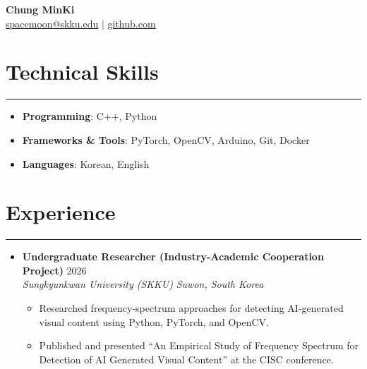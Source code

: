 \documentclass[letterpaper, 10pt]{article}
\begin{document}
\begin{center}
\textbf{\LARGE Chung MinKi} \\ \vspace{2pt}
\href{mailto:spacemoon@skku.edu}{\underline{spacemoon@skku.edu}} $|$
\href{https://github.com/justinkays}{\underline{github.com}}
\end{center}
\section*{Technical Skills}
\hrule
\vspace{4pt}
\begin{itemize}
\item[] \textbf{Programming}: C++, Python%
\item[] \textbf{Frameworks \& Tools}: PyTorch, OpenCV, Arduino, Git, Docker%
\item[] \textbf{Languages}: Korean, English%
\end{itemize}
\section*{Experience}
\hrule
\vspace{4pt}
\begin{itemize}
\item[]
\textbf{Undergraduate Researcher (Industry-Academic Cooperation Project)} \hfill 2026 \\
\textit{Sungkyunkwan University (SKKU)} \hfill \textit{Suwon, South Korea}
\begin{itemize}
\item Researched frequency-spectrum approaches for detecting AI-generated visual content using Python, PyTorch, and OpenCV.
\item Published and presented ``An Empirical Study of Frequency Spectrum for Detection of AI Generated Visual Content'' at the CISC conference.
\end{itemize}
\end{itemize}
\end{document}
